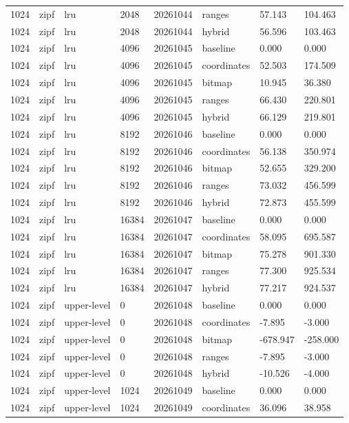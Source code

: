\begin{tabular}{llllllll}
1024 & zipf & lru & 2048 & 20261044 & ranges & 57.143 & 104.463 \\
1024 & zipf & lru & 2048 & 20261044 & hybrid & 56.596 & 103.463 \\
1024 & zipf & lru & 4096 & 20261045 & baseline & 0.000 & 0.000 \\
1024 & zipf & lru & 4096 & 20261045 & coordinates & 52.503 & 174.509 \\
1024 & zipf & lru & 4096 & 20261045 & bitmap & 10.945 & 36.380 \\
1024 & zipf & lru & 4096 & 20261045 & ranges & 66.430 & 220.801 \\
1024 & zipf & lru & 4096 & 20261045 & hybrid & 66.129 & 219.801 \\
1024 & zipf & lru & 8192 & 20261046 & baseline & 0.000 & 0.000 \\
1024 & zipf & lru & 8192 & 20261046 & coordinates & 56.138 & 350.974 \\
1024 & zipf & lru & 8192 & 20261046 & bitmap & 52.655 & 329.200 \\
1024 & zipf & lru & 8192 & 20261046 & ranges & 73.032 & 456.599 \\
1024 & zipf & lru & 8192 & 20261046 & hybrid & 72.873 & 455.599 \\
1024 & zipf & lru & 16384 & 20261047 & baseline & 0.000 & 0.000 \\
1024 & zipf & lru & 16384 & 20261047 & coordinates & 58.095 & 695.587 \\
1024 & zipf & lru & 16384 & 20261047 & bitmap & 75.278 & 901.330 \\
1024 & zipf & lru & 16384 & 20261047 & ranges & 77.300 & 925.534 \\
1024 & zipf & lru & 16384 & 20261047 & hybrid & 77.217 & 924.537 \\
1024 & zipf & upper-level & 0 & 20261048 & baseline & 0.000 & 0.000 \\
1024 & zipf & upper-level & 0 & 20261048 & coordinates & -7.895 & -3.000 \\
1024 & zipf & upper-level & 0 & 20261048 & bitmap & -678.947 & -258.000 \\
1024 & zipf & upper-level & 0 & 20261048 & ranges & -7.895 & -3.000 \\
1024 & zipf & upper-level & 0 & 20261048 & hybrid & -10.526 & -4.000 \\
1024 & zipf & upper-level & 1024 & 20261049 & baseline & 0.000 & 0.000 \\
1024 & zipf & upper-level & 1024 & 20261049 & coordinates & 36.096 & 38.958 \\

\end{tabular}
